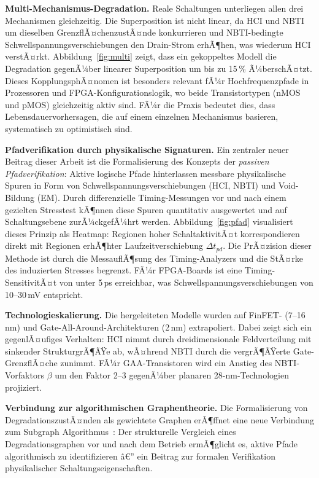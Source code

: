 ﻿\documentclass[a4paper,12pt]{article}
\theoremstyle{definition}
\begin{document}
\textbf{Multi-Mechanismus-Degradation.}
Reale Schaltungen unterliegen allen drei Mechanismen gleichzeitig. Die Superposition
ist nicht linear, da HCI und NBTI um dieselben GrenzflÃ¤chenzustÃ¤nde konkurrieren
und NBTI-bedingte Schwellspannungsverschiebungen den Drain-Strom erhÃ¶hen, was
wiederum HCI verstÃ¤rkt. Abbildung~\ref{fig:multi} zeigt, dass ein gekoppeltes Modell
die Degradation gegenÃ¼ber linearer Superposition um bis zu 15\,\% Ã¼berschÃ¤tzt.
Dieses KopplungsphÃ¤nomen ist besonders relevant fÃ¼r Hochfrequenzpfade in
Prozessoren und FPGA-Konfigurationslogik, wo beide Transistortypen (nMOS und pMOS)
gleichzeitig aktiv sind. FÃ¼r die Praxis bedeutet dies, dass Lebensdauervorhersagen,
die auf einem einzelnen Mechanismus basieren, systematisch zu optimistisch sind.

\textbf{Pfadverifikation durch physikalische Signaturen.}
Ein zentraler neuer Beitrag dieser Arbeit ist die Formalisierung des Konzepts der
\emph{passiven Pfadverifikation}: Aktive logische Pfade hinterlassen messbare
physikalische Spuren in Form von Schwellspannungsverschiebungen (HCI, NBTI)
und Void-Bildung (EM). Durch differenzielle Timing-Messungen vor und nach einem
gezielten Stresstest kÃ¶nnen diese Spuren quantitativ ausgewertet und auf
Schaltungsebene zurÃ¼ckgefÃ¼hrt werden. Abbildung~\ref{fig:pfad} visualisiert
dieses Prinzip als Heatmap: Regionen hoher SchaltaktivitÃ¤t korrespondieren direkt
mit Regionen erhÃ¶hter Laufzeitverschiebung $\Delta t_{pd}$.
Die PrÃ¤zision dieser Methode ist durch die MessauflÃ¶sung des Timing-Analyzers
und die StÃ¤rke des induzierten Stresses begrenzt. FÃ¼r FPGA-Boards ist eine
Timing-SensitivitÃ¤t von unter 5\,ps erreichbar, was Schwellspannungsverschiebungen
von 10--30\,mV entspricht.

\textbf{Technologieskalierung.}
Die hergeleiteten Modelle wurden auf FinFET- (7--16\,nm) und
Gate-All-Around-Architekturen (2\,nm) extrapoliert. Dabei zeigt sich ein
gegenlÃ¤ufiges Verhalten: HCI nimmt durch dreidimensionale Feldverteilung mit
sinkender StrukturgrÃ¶ÃŸe ab, wÃ¤hrend NBTI durch die vergrÃ¶ÃŸerte Gate-GrenzflÃ¤che
zunimmt. FÃ¼r GAA-Transistoren wird ein Anstieg des NBTI-Vorfaktors $\beta$
um den Faktor 2--3 gegenÃ¼ber planaren 28-nm-Technologien projiziert.

\textbf{Verbindung zur algorithmischen Graphentheorie.}
Die Formalisierung von DegradationszustÃ¤nden als gewichtete Graphen erÃ¶ffnet
eine neue Verbindung zum Subgraph Algorithmus~\cite{epp2026}: Der
strukturelle Vergleich eines Degradationsgraphen vor und nach dem Betrieb
ermÃ¶glicht es, aktive Pfade algorithmisch zu identifizieren â€” ein Beitrag zur
formalen Verifikation physikalischer Schaltungseigenschaften.
\end{document}
